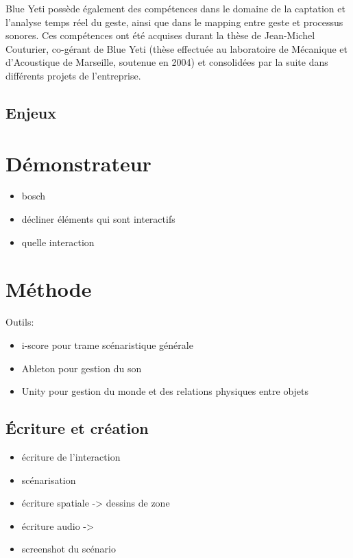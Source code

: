 \documentclass[french]{article}
\begin{document}
    Blue Yeti possède également des compétences dans le domaine de la captation et l’analyse temps 
    réel du geste, ainsi que dans le mapping entre geste et processus sonores. Ces compétences ont 
    été acquises durant la thèse de Jean-Michel Couturier, co-gérant de Blue Yeti (thèse effectuée au 
    laboratoire de Mécanique et d’Acoustique de Marseille, soutenue en 2004) et consolidées par la suite dans différents projets de l’entreprise.
    
    \subsection*{Enjeux}
    
    \section*{Démonstrateur}
    \begin{itemize}
    \item bosch
    \item décliner éléments qui sont interactifs
    \item quelle interaction 
    \end{itemize}
    
    \section*{Méthode}
    Outils:  
    \begin{itemize}
    \item i-score pour trame scénaristique générale
    \item Ableton pour gestion du son
    \item Unity pour gestion du monde et des relations physiques entre objets
    \end{itemize}
    
    \subsection*{Écriture et création}
    \begin{itemize}
    \item écriture de l'interaction
    \item scénarisation
    \item écriture spatiale -> dessins de zone
    \item écriture audio ->
    \item screenshot du scénario
    \end{itemize}
    
\end{document}
